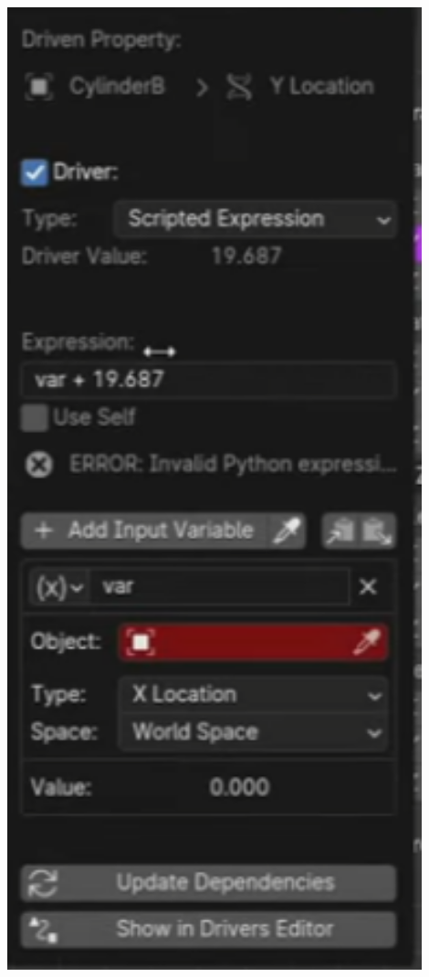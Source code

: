 \documentclass{article}
\begin{document}
\begin{minipage}{0.25\textwidth}
    \centering
    \includegraphics[width=0.9\textwidth]{blender_docs_images/my_driver_scriptable_expression.png}
\end{minipage}%
\end{document}
